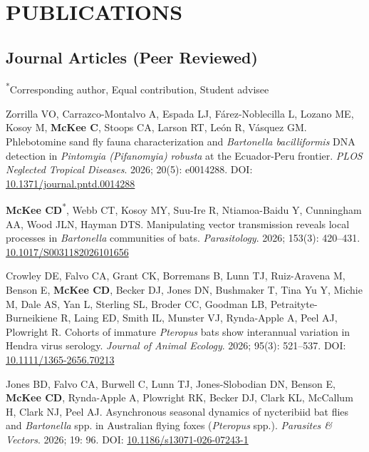 \documentclass{cv}
\begin{document}
\section*{PUBLICATIONS}

\subsection*{Journal Articles (Peer Reviewed)}

{\small \textsuperscript{*}Corresponding author, \textsuperscript{\dag}Equal contribution, \textsuperscript{\ddag}Student advisee}

\begin{pubenum}

\item Zorrilla VO, Carrazco-Montalvo A, Espada LJ, Fárez-Noblecilla L, Lozano ME, Kosoy M, \textbf{McKee C}, Stoops CA, Larson RT, León R, Vásquez GM. Phlebotomine sand fly fauna characterization and \textit{Bartonella bacilliformis} DNA detection in \textit{Pintomyia (Pifanomyia) robusta} at the Ecuador-Peru frontier. \textit{PLOS Neglected Tropical Diseases}. 2026; 20(5): e0014288. DOI: \href{https://doi.org/10.1371/journal.pntd.0014288}{10.1371/journal.pntd.0014288}

\item \textbf{McKee CD}\textsuperscript{*}, Webb CT, Kosoy MY, Suu-Ire R, Ntiamoa-Baidu Y, Cunningham AA, Wood JLN, Hayman DTS. Manipulating vector transmission reveals local processes in \textit{Bartonella} communities of bats. \textit{Parasitology}. 2026; 153(3): 420--431. \href{https://doi.org/10.1017/S0031182026101656}{10.1017/S0031182026101656}

\item Crowley DE, Falvo CA, Grant CK, Borremans B, Lunn TJ, Ruiz-Aravena M, Benson E, \textbf{McKee CD}, Becker DJ, Jones DN, Bushmaker T, Tina Yu Y, Michie M, Dale AS, Yan L, Sterling SL, Broder CC, Goodman LB, Petraityte-Burneikiene R, Laing ED, Smith IL, Munster VJ, Rynda-Apple A, Peel AJ, Plowright R. Cohorts of immature \textit{Pteropus} bats show interannual variation in Hendra virus serology. \textit{Journal of Animal Ecology}. 2026; 95(3): 521--537. DOI: \href{http://doi.org/10.1111/1365-2656.70213}{10.1111/1365-2656.70213}

\item Jones BD, Falvo CA, Burwell C, Lunn TJ, Jones-Slobodian DN, Benson E, \textbf{McKee CD}, Rynda-Apple A, Plowright RK, Becker DJ, Clark KL, McCallum H, Clark NJ, Peel AJ. Asynchronous seasonal dynamics of nycteribiid bat flies and \textit{Bartonella} spp. in Australian flying foxes (\textit{Pteropus} spp.). \textit{Parasites \& Vectors}. 2026; 19: 96. DOI: \href{https://doi.org/10.1186/s13071-026-07243-1}{10.1186/s13071-026-07243-1}


\end{pubenum}
\end{document}
